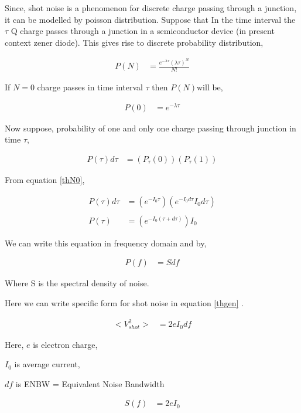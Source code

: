 \documentclass[final,5p,12pt,twocolumn]{elsaarticle}
\begin{document}
Since, shot noise is a phenomenon for discrete charge passing through a junction, it can be modelled by poisson distribution. Suppose that In the time interval the $\tau$ Q charge passes through a junction in a semiconductor device (in present context zener diode). This gives rise to discrete probability distribution,

\begin{align}
P(N) & = \frac{e^{-\lambda \tau}(\lambda \tau)^{N}}{N!}
\end{align}

If $N=0$ charge passes in time interval $\tau$ then $P(N)$will be,

\begin{align} \label{eqN0}
P(0) & = e^{-\lambda \tau}
\end{align}

Now suppose, probability of one and only one charge passing through junction in time $\tau$,

\begin{align*}
P(\tau)d\tau & = (P_{\tau}(0))(P_{\tau}(1))
\end{align*}

From equation \ref{thN0},


\begin{align*}
P(\tau)d\tau & = (e^{-I_0 \tau})(e^{-I_0 d\tau} I_0 d\tau)\\
\\  
P(\tau) & = (e^{-I_0 (\tau + d\tau)}) I_0
\end{align*}

We can write this equation in frequency domain and by,

\begin{align}\label{thgenl}
P(f) & = S df
\end{align}

Where S is the spectral density of noise.

Here we can write specific form for shot noise in equation \ref{thgen} \cite{campbell}.

\begin{align}\label{thshotvo}
<V_{shot}^2> & = 2 e I_0 df
\end{align}

Here, $e$ is electron charge,

$I_0$ is average current,

$df$ is ENBW = Equivalent Noise Bandwidth

\begin{align}\label{thshots}
S(f) & = 2 e I_0
\end{align}
\end{document}
